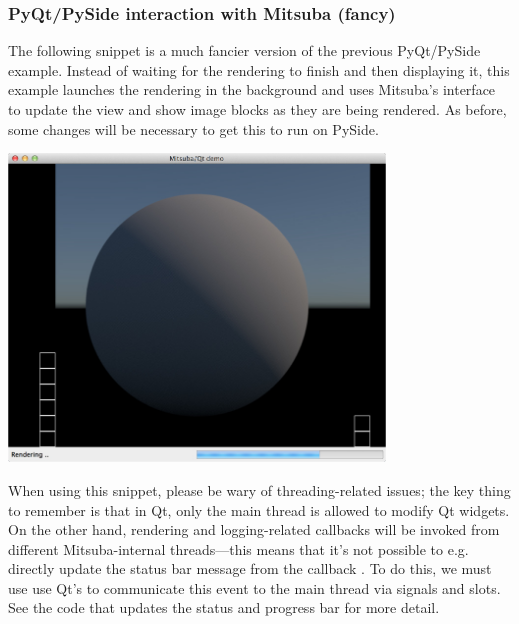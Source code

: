 \subsubsection{PyQt/PySide interaction with Mitsuba (fancy)}
The following snippet is a much fancier version of the previous PyQt/PySide example.
Instead of waiting for the rendering to finish and then displaying it, this example launches the
rendering in the background and uses Mitsuba's  interface to update the
view and show image blocks as they are being rendered.
As before, some changes will be necessary to get this to run on PySide.
\begin{center}
    \includegraphics[width=10cm]{images/python_demo.jpg}
\end{center}
When using this snippet, please be wary of threading-related issues; the key thing to remember is that
in Qt, only the main thread is allowed to modify Qt widgets. On the other hand, rendering and logging-related
callbacks will be invoked from different Mitsuba-internal threads---this means that it's not possible to e.g.
directly update the status bar message from the callback . To do this, we must use
use Qt's  to communicate this event to the main thread via signals and slots. See the
code that updates the status and progress bar for more detail.
